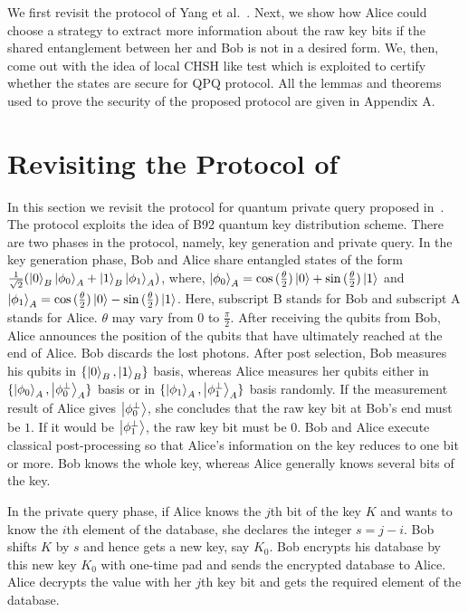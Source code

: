 \documentclass[twocolumn,pra,aps,amssymb]{revtex4}
\begin{document}
We first revisit the protocol of Yang et al.~\cite{Yang}. Next, we show how Alice could choose a strategy to extract more information about the raw key bits if the shared entanglement between her and Bob is not in a desired form. We, then, come out with the idea of local CHSH like test which is exploited to certify whether the states are secure for QPQ protocol. All the lemmas and theorems used to prove the security of the proposed protocol are given in Appendix A. \medskip

\section{Revisiting the Protocol of~\cite{Yang}}
In this section we revisit the protocol for quantum private query proposed in~\cite{Yang}.  The protocol exploits the idea of B92 quantum key distribution scheme. There are two phases in the protocol, namely, key generation and private query. In the key generation phase,
Bob and Alice share entangled states of the form
$\frac{1}{\sqrt{2}}(\left|0\right\rangle_{B}\left|\phi_0\right\rangle_{A}+\left|1\right\rangle_{B}\left|\phi_1\right\rangle_{A})$, where, $\left|\phi_{0}\right\rangle_{A}=\cos{(\frac{\theta}{2})}\left|0\right\rangle+\sin{(\frac{\theta}{2})}\left|1\right\rangle$ and $\left|\phi_{1}\right\rangle_{A}=\cos{(\frac{\theta}{2})\ensuremath{\left|0\right\rangle}}-\sin{(\frac{\theta}{2})}\left|1\right\rangle$. Here, subscript B stands for Bob and subscript A stands for Alice. $\theta$ may vary from $0$ to $\frac{\pi}{2}$.
After receiving the qubits from Bob, Alice announces the position of the qubits that have ultimately  reached at the end of Alice. Bob discards the lost photons. 
After post selection, Bob measures his qubits in $\{\left|0\right\rangle_{B}, \left|1\right\rangle_{B}\}$ basis, whereas Alice measures her qubits either in $\{\left|\phi_{0}\right\rangle_{A},\left|\phi_{0}^{\perp}\right\rangle_{A}\}$ basis or in $\{\left|\phi_{1}\right\rangle_{A}, \left|\phi_{1}^{\perp}\right\rangle_{A}\}$ basis randomly.  
If the measurement result of Alice gives $\left|\phi_{0}^{\perp}\right\rangle$, she concludes that the raw key bit at Bob's end must be $1$. If it would be $\left|\phi_{1}^{\perp}\right\rangle$, the raw key bit must be $0$. 
Bob and Alice execute classical post-processing so that Alice's information on the key reduces  to one bit or more.  Bob knows the whole key, whereas Alice generally knows several bits of the key.   

In the private query phase,
if Alice knows the $j$th bit of the key $K$ and wants to know the $i$th element of the database, she declares the integer $s=j-i$. 
Bob shifts $K$ by $s$ and hence gets a new key, say $K_0$.
Bob encrypts his database by this new key $K_0$ with one-time pad and sends the encrypted database to Alice.
 Alice decrypts the value with her $j$th key bit and gets the required element of the database.
\end{document}
